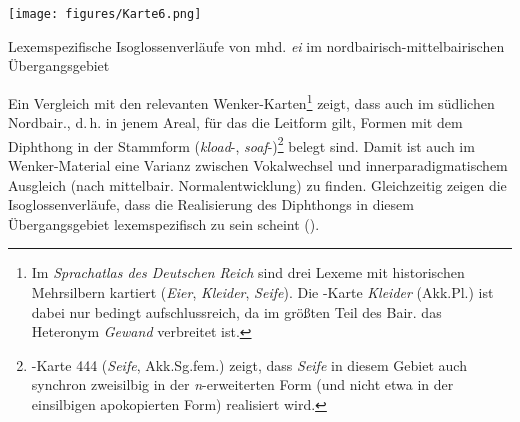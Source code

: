 \begin{map}
\texttt{[image: figures/Karte6.png]}
\caption{Lexemspezifische Isoglossenverläufe von mhd. \textit{ei} im nordbairisch-mittelbairischen Übergangsgebiet}
\label{map:6}
\end{map}

Ein Vergleich mit den relevanten Wenker-Karten\footnote{Im \textit{Sprachatlas des Deutschen Reich} sind drei Lexeme mit historischen Mehrsilbern kartiert (\textit{Eier}, \textit{Kleider}, \textit{Seife}). Die \citealt{WA}-Karte \textit{Kleider} (Akk.Pl.) ist dabei nur bedingt aufschlussreich, da im größten Teil des Bair. das Heteronym \textit{Gewand} verbreitet ist.} zeigt, dass auch im südlichen Nordbair., d.\,h. in jenem Areal, für das die Leitform  gilt, Formen mit dem Diphthong  in der Stammform (\textit{kload}{}-, \textit{soaf}{}-)\footnote{\citealt{WA}-Karte 444 (\textit{Seife}, Akk.Sg.fem.) zeigt, dass \textit{Seife} in diesem Gebiet auch synchron zweisilbig in der \textit{n}{}-erweiterten Form (und nicht etwa in der einsilbigen apokopierten Form) realisiert wird.} belegt sind. Damit ist auch im Wenker-Material eine Varianz zwischen Vokalwechsel und innerparadigmatischem Ausgleich (nach mittelbair. Normalentwicklung) zu finden. Gleichzeitig zeigen die Isoglossenverläufe, dass die Realisierung des Diphthongs in diesem Übergangsgebiet lexemspezifisch zu sein scheint ().

